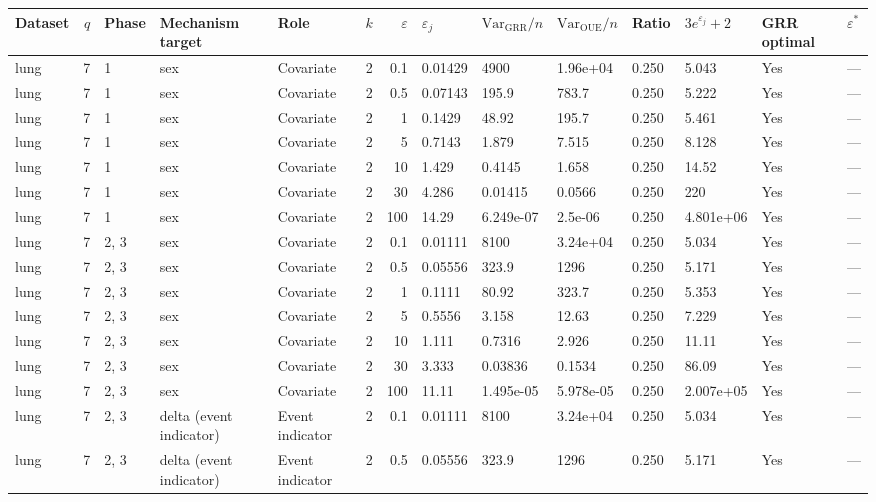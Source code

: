 \begin{tabular}{lrlllrrlllllll}
  \toprule
Dataset & $q$ & Phase & Mechanism target & Role & $k$ & $\varepsilon$ & $\varepsilon_j$ & $\mathrm{Var}_{\mathrm{GRR}}/n$ & $\mathrm{Var}_{\mathrm{OUE}}/n$ & Ratio & $3e^{\varepsilon_j}+2$ & GRR optimal & $\varepsilon^{*}$ \\ 
  \midrule
lung & 7 & 1 & sex & Covariate & 2 &   0.1 & 0.01429 & 4900 & 1.96e+04 & 0.250 & 5.043 & Yes & --- \\ 
  lung & 7 & 1 & sex & Covariate & 2 &   0.5 & 0.07143 & 195.9 & 783.7 & 0.250 & 5.222 & Yes & --- \\ 
  lung & 7 & 1 & sex & Covariate & 2 &     1 & 0.1429 & 48.92 & 195.7 & 0.250 & 5.461 & Yes & --- \\ 
  lung & 7 & 1 & sex & Covariate & 2 &     5 & 0.7143 & 1.879 & 7.515 & 0.250 & 8.128 & Yes & --- \\ 
  lung & 7 & 1 & sex & Covariate & 2 &    10 & 1.429 & 0.4145 & 1.658 & 0.250 & 14.52 & Yes & --- \\ 
  lung & 7 & 1 & sex & Covariate & 2 &    30 & 4.286 & 0.01415 & 0.0566 & 0.250 & 220 & Yes & --- \\ 
  lung & 7 & 1 & sex & Covariate & 2 &   100 & 14.29 & 6.249e-07 & 2.5e-06 & 0.250 & 4.801e+06 & Yes & --- \\ 
  lung & 7 & 2, 3 & sex & Covariate & 2 &   0.1 & 0.01111 & 8100 & 3.24e+04 & 0.250 & 5.034 & Yes & --- \\ 
  lung & 7 & 2, 3 & sex & Covariate & 2 &   0.5 & 0.05556 & 323.9 & 1296 & 0.250 & 5.171 & Yes & --- \\ 
  lung & 7 & 2, 3 & sex & Covariate & 2 &     1 & 0.1111 & 80.92 & 323.7 & 0.250 & 5.353 & Yes & --- \\ 
  lung & 7 & 2, 3 & sex & Covariate & 2 &     5 & 0.5556 & 3.158 & 12.63 & 0.250 & 7.229 & Yes & --- \\ 
  lung & 7 & 2, 3 & sex & Covariate & 2 &    10 & 1.111 & 0.7316 & 2.926 & 0.250 & 11.11 & Yes & --- \\ 
  lung & 7 & 2, 3 & sex & Covariate & 2 &    30 & 3.333 & 0.03836 & 0.1534 & 0.250 & 86.09 & Yes & --- \\ 
  lung & 7 & 2, 3 & sex & Covariate & 2 &   100 & 11.11 & 1.495e-05 & 5.978e-05 & 0.250 & 2.007e+05 & Yes & --- \\ 
  lung & 7 & 2, 3 & delta (event indicator) & Event indicator & 2 &   0.1 & 0.01111 & 8100 & 3.24e+04 & 0.250 & 5.034 & Yes & --- \\ 
  lung & 7 & 2, 3 & delta (event indicator) & Event indicator & 2 &   0.5 & 0.05556 & 323.9 & 1296 & 0.250 & 5.171 & Yes & --- \\ 

\end{tabular}
